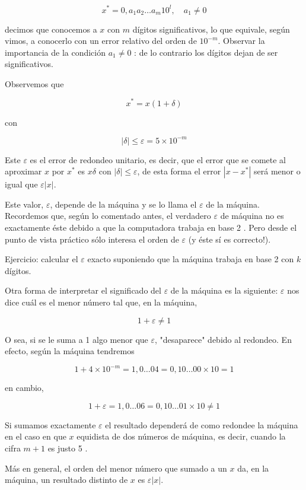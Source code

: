 \documentclass[10pt]{book}
\begin{document}
$$
x^{*}=0, a_{1} a_{2} \ldots a_{m} 10^{l}, \quad a_{1} \neq 0
$$

decimos que conocemos a $x$ con $m$ dígitos significativos, lo que equivale, según vimos, a conocerlo con un error relativo del orden de $10^{-m}$. Observar la importancia de la condición $a_{1} \neq 0$ : de lo contrario los dígitos dejan de ser significativos.

Observemos que

$$
x^{*}=x(1+\delta)
$$

con

$$
|\delta| \leq \varepsilon=5 \times 10^{-m}
$$

Este $\varepsilon$ es el error de redondeo unitario, es decir, que el error que se comete al aproximar $x$ por $x^{*}$ es $x \delta$ con $|\delta| \leq \varepsilon$, de esta forma el error $\left|x-x^{*}\right|$ será menor o igual que $\varepsilon|x|$.

Este valor, $\varepsilon$, depende de la máquina y se lo llama el $\varepsilon$ de la máquina. Recordemos que, según lo comentado antes, el verdadero $\varepsilon$ de máquina no es exactamente éste debido a que la computadora trabaja en base 2 . Pero desde el punto de vista práctico sólo interesa el orden de $\varepsilon$ (y éste sí es correcto!).

Ejercicio: calcular el $\varepsilon$ exacto suponiendo que la máquina trabaja en base 2 con $k$ dígitos.

Otra forma de interpretar el significado del $\varepsilon$ de la máquina es la siguiente: $\varepsilon$ nos dice cuál es el menor número tal que, en la máquina,

$$
1+\varepsilon \neq 1
$$

O sea, si se le suma a 1 algo menor que $\varepsilon$, "desaparece" debido al redondeo. En efecto, según la máquina tendremos

$$
1+4 \times 10^{-m}=1,0 \ldots 04=0,10 \ldots 00 \times 10=1
$$

en cambio,

$$
1+\varepsilon=1,0 \ldots 06=0,10 \ldots 01 \times 10 \neq 1
$$

Si sumamos exactamente $\varepsilon$ el resultado dependerá de como redondee la máquina en el caso en que $x$ equidista de dos números de máquina, es decir, cuando la cifra $m+1$ es justo 5 .

Más en general, el orden del menor número que sumado a un $x$ da, en la máquina, un resultado distinto de $x$ es $\varepsilon|x|$.
\end{document}
